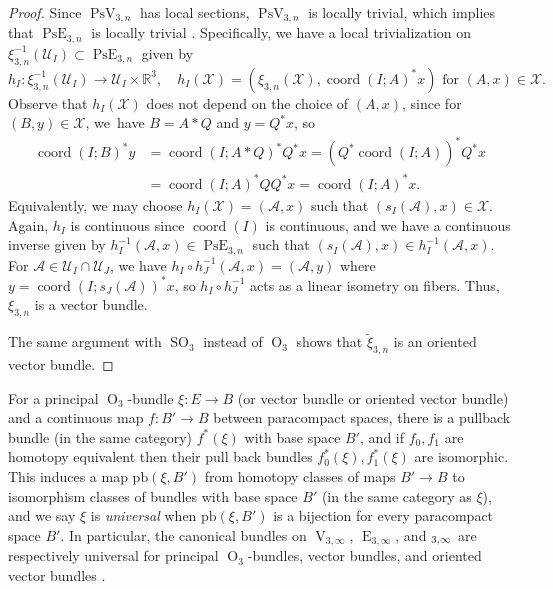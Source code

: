 \documentclass[JEP,XML,SOM,Unicode,NoFloatCountersInSection,published]{cedram}
\theoremstyle{remark}
\let\mc\mathcal
\let\mb\mathbb
\let\df\emph
\DeclareMathOperator{\pe}{PsE}
\DeclareMathOperator{\e}{E}
\let\oe\relax
\DeclareMathOperator{\oe}{\widetilde E}
\DeclareMathOperator{\orth}{O}
\DeclareMathOperator{\sorth}{SO}
\DeclareMathOperator{\stief}{V}
\DeclareMathOperator{\pstief}{PsV}
\DeclareMathOperator{\coord}{coord}
\begin{document}
\begin{proof}
Since $\pstief_{3,n}$ has local sections, $\pstief_{3,n}$ is locally trivial, which implies that $\pe_{3,n}$ is locally trivial \cite[\S 4.7]{husemoller1994fibre}.
Specifically, we have a local trivialization on $\xi_{3,n}^{-1}(\mc{U}_I) \subset \pe_{3,n}$ given by
\[ h_I : \xi_{3,n}^{-1}(\mc{U}_I) \to \mc{U}_I \times \mb{R}^3, \quad h_I(\mc{X}) = (\xi_{3,n}(\mc{X}),\coord(I;A)^*x) \text{ for } (A,x) \in \mc{X}. \]
Observe that $h_I(\mc{X})$ does not depend on the choice of $(A,x)$, since for $(B,y) \in \mc{X}$, we~have $B = A*Q$ and $y = Q^* x$, so
\begin{align*}
\coord(I;B)^*y &= \coord(I;A*Q)^*Q^*x = (Q^*\coord(I;A))^*Q^*x\\
&= \coord(I;A)^*QQ^*x = \coord(I;A)^*x.
\end{align*}
Equivalently, we may choose $h_I(\mc{X})=(\mc{A},x)$ such that $(s_I(\mc{A}),x) \in \mc{X}$. Again, $h_I$ is continuous since $\coord(I)$ is continuous, and we have a continuous inverse given by
$h_I^{-1}(\mc{A},x) \in \pe_{3,n}$ such that $(s_I(\mc{A}),x) \in h_I^{-1}(\mc{A},x)$.
For $\mc{A} \in \mc{U}_I \cap \mc{U}_J$, we have $h_I \circ h_J^{-1}(\mc{A},x) = (\mc{A},y)$ where $y = \coord(I;s_J(\mc{A}))^*x$, so $h_I \circ h_J^{-1}$ acts as a linear isometry on fibers.
Thus, $\xi_{3,n}$ is a vector bundle.

The same argument with $\sorth_3$ instead of $\orth_3$ shows that $\widetilde\xi_{3,n}$ is an oriented vector bundle.
\end{proof}

For a principal $\orth_3$-bundle $\xi: E \to B$ (or vector bundle or oriented vector bundle) and a continuous map $f: B' \to B$ between paracompact spaces, there is a pullback bundle (in the same category) $f^*(\xi)$ with base space $B'$, and if $f_0,f_1$ are homotopy equivalent then their pull back bundles $f_0^*(\xi),f_1^*(\xi)$ are isomorphic.
This induces a map $\text{pb}(\xi,B')$ from homotopy classes of maps $B' \to B$ to isomorphism classes of bundles with base space $B'$ (in the same category as $\xi$), and we say $\xi$ is \df{universal} when $\text{pb}(\xi,B')$ is a bijection for every paracompact space $B'$.
In particular, the canonical bundles on $\stief_{3,\infty}$, $\e_{3,\infty}$, and $\oe_{3,\infty}$ are respectively universal for principal $\orth_3$-bundles, vector bundles, and oriented vector bundles \cite{husemoller1994fibre}.
\end{document}
